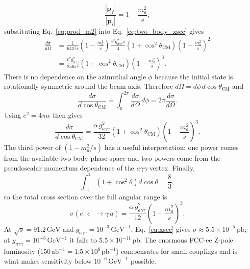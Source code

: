 \documentclass[12pt,a4paper]{article}
\begin{document}
\begin{equation}
    \frac{|\mathbf{p}_f|}{|\mathbf{p}_i|}
    =
    1-\frac{m_{a}^2}{s},
\end{equation}
substituting Eq.~\eqref{eq:prod_m2} into Eq.~\eqref{eq:two_body_xsec} gives
\begin{align}
    \frac{d\sigma}{d\Omega}
    &=
    \frac{1}{64\pi^2s}
    \left(1-\frac{m_{a}^2}{s}\right)
    \frac{e^2g_{a\gamma\gamma}^2s}{4}
    \left(1+\cos^2\theta_\mathrm{CM}\right)
    \left(1-\frac{m_{a}^2}{s}\right)^2
    \nonumber\\
    &=
    \frac{e^2g_{a\gamma\gamma}^2}{256\pi^2}
    \left(1+\cos^2\theta_\mathrm{CM}\right)
    \left(1-\frac{m_{a}^2}{s}\right)^3.
    \label{eq:dsigma_domega_step}
\end{align}
There is no dependence on the azimuthal angle $\phi$ because the initial state
is rotationally symmetric around the beam axis. Therefore
$d\Omega=d\phi\,d\cos\theta_\mathrm{CM}$ and
\begin{equation}
    \frac{d\sigma}{d\cos\theta_\mathrm{CM}}
    =
    \int_0^{2\pi}
    \frac{d\sigma}{d\Omega}\,d\phi
    =
    2\pi\frac{d\sigma}{d\Omega}.
\end{equation}
Using $e^2=4\pi\alpha$ then gives
\begin{equation}
    \frac{d\sigma}{d\cos\theta_\mathrm{CM}}
    =
    \frac{\alpha\,g_{a\gamma\gamma}^2}{32}
    \left(1+\cos^2\theta_\mathrm{CM}\right)
    \left(1-\frac{m_{a}^2}{s}\right)^3.
    \label{eq:dsigma_dcostheta}
\end{equation}
The third power of $(1-m_{a}^2/s)$ has a useful interpretation: one power comes
from the available two-body phase space and two powers come from the
pseudoscalar momentum dependence of the $a\gamma\gamma$ vertex. Finally,
\begin{equation}
    \int_{-1}^{1}
    \left(1+\cos^2\theta\right)d\cos\theta
    =
    \frac{8}{3},
\end{equation}
so the total cross section over the full angular range is
\begin{equation}
    \sigma(e^+e^-\to\gamma\,a)
    =
    \frac{\alpha\,g_{a\gamma\gamma}^2}{12}
    \left(1 - \frac{m_{a}^2}{s}\right)^3.
    \label{eq:xsec}
\end{equation}
At $\sqrt{s} = 91.2\,\text{GeV}$ and $g_{a\gamma\gamma} = 10^{-3}\,\text{GeV}^{-1}$,
Eq.~\eqref{eq:xsec} gives $\sigma \approx 5.5\times10^{-5}\,\text{pb}$;
at $g_{a\gamma\gamma} = 10^{-6}\,\text{GeV}^{-1}$ it falls to
$5.5\times10^{-11}\,\text{pb}$. The enormous FCC-ee Z-pole luminosity
($150\,\text{ab}^{-1} = 1.5\times10^{8}\,\text{pb}^{-1}$) compensates for small couplings and is
what makes sensitivity below $10^{-6}\,\text{GeV}^{-1}$ possible.
\end{document}
